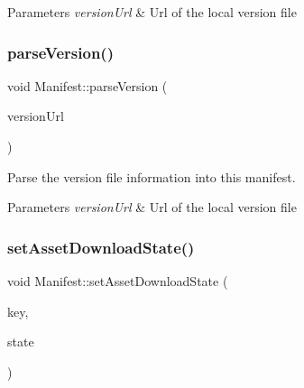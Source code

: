 \begin{DoxyParams}{Parameters}
{\em version\+Url} & Url of the local version file \\
\hline
\end{DoxyParams}
\mbox{\label{classManifest_adf48429fda66eba3c19db8fc09f7f6d2}} 
\subsubsection{\texorpdfstring{parse\+Version()}{parseVersion()}\hspace{0.1cm}{\footnotesize\ttfamily [2/2]}}
{\footnotesize\ttfamily void Manifest\+::parse\+Version (\begin{DoxyParamCaption}\item[{const std\+::string \&}]{version\+Url }\end{DoxyParamCaption})\hspace{0.3cm}{\ttfamily [protected]}}



Parse the version file information into this manifest. 


\begin{DoxyParams}{Parameters}
{\em version\+Url} & Url of the local version file \\
\hline
\end{DoxyParams}
\mbox{\label{classManifest_afd94d5f1d587ec8c82cf47ad8b3ea7bf}} 
\subsubsection{\texorpdfstring{set\+Asset\+Download\+State()}{setAssetDownloadState()}\hspace{0.1cm}{\footnotesize\ttfamily [1/2]}}
{\footnotesize\ttfamily void Manifest\+::set\+Asset\+Download\+State (\begin{DoxyParamCaption}\item[{const std\+::string \&}]{key,  }\item[{const Download\+State \&}]{state }\end{DoxyParamCaption})\hspace{0.3cm}{\ttfamily [protected]}}



